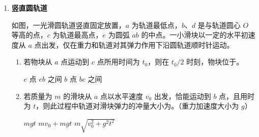 \documentclass[\gkver]{gaokaozhenti}
\begin{document}
\begin{enumerate}
{代入数据可得 $E=3+r$；$E=1.5+2r$

联立两式解得 $E=4.5 \UV$；$r=1.5 \UO$

2．（1）因为电阻 $I-U$ 图线的斜率为电阻的倒数，随着电阻两端的电压增大，可知斜率在不断增大，故随着电阻两端的电压增大，$R$ 减小，再根据电阻定律 $R=\rho\frac{l}{S}$ 可得 $\rho$ 也在减小，B 选项正确。

（2）从图像上可以看出，当电阻两端电压为 $1.8 \UV$ 时，可读出此时流过电阻的电流为 $0.125 \UA$，根据公式 $P=UI$，代入数据解得 $P=0.225 \UW$。

（3）根据 $I-U$ 图像，实验装置能测得 $U=0$ 附近的数据，因此滑动变阻器应采用分压式接法，而且电流表应测量流过电阻的电流，可推测该实验电路符合条件的只有 C 选项。

3．（1）闭合开关，稳定时，电容器两端的电压为 $U$。根据电容的定义式可知电容器的电荷量为 $Q=CU$。

（2）根据牛顿第二定律得 $qE=q\frac{U}{d}=ma$，得加速度 $a=\frac{qU}{md}$。

粒子恰好从上极板右侧边缘射出，垂直于板的方向有 $\frac{d}{2}=\frac{1}{2}at^{2}$，解得 $t=d\sqrt{\frac{m}{qU}}$

水平方向上，可求得两极板的长度 $L=v_{0}t=v_{0}d\sqrt{\frac{m}{qU}}$
}

\item
\textbf{竖直圆轨道}

如图，一光滑圆轨道竖直固定放置，$a$ 为轨道最低点，$b$、$d$ 是与轨道圆心 $O$ 等高的点，$c$ 为轨道最高点，$e$ 为圆弧 $ab$ 的中点。一小滑块以一定的水平初速度从 $a$ 点出发，仅在重力和轨道对其弹力作用下沿圆轨道顺时针运动。

\onepicture[align=right, h=3.03cm]{}
\begin{enumerate}
	\item
	若物块从 $a$ 点运动到 $c$ 点所用时间为 $t_{0}$，则在 $t_{0}/2$ 时刻，物块位于。

	{$e$ 点}
	{$eb$ 之间}
	{$b$ 点}
	{$bc$ 之间}

	\item
	若质量为 $m$ 的滑块从 $a$ 点以水平速度 $v_{0}$ 出发，恰能运动到 $b$ 点，且用时为 $t$，则此过程中轨道对滑块弹力的冲量大小为。（重力加速度大小为 $g$）

	{$mgt$}
	{$mv_{0}+mgt$}
	{$m\sqrt{v_{0}^{2}+g^{2}t^{2}}$}


\end{enumerate}
\end{enumerate}
\end{document}
